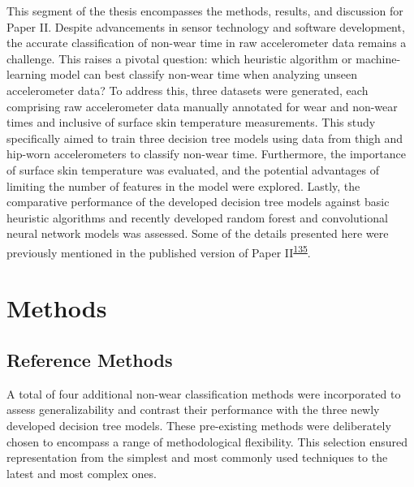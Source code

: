 \documentclass[
  10pt,
]{scrbook}
\begin{document}
This segment of the thesis encompasses the methods, results, and
discussion for Paper II. Despite advancements in sensor technology and
software development, the accurate classification of non-wear time in
raw accelerometer data remains a challenge. This raises a pivotal
question: which heuristic algorithm or machine-learning model can best
classify non-wear time when analyzing unseen accelerometer data? To
address this, three datasets were generated, each comprising raw
accelerometer data manually annotated for wear and non-wear times and
inclusive of surface skin temperature measurements. This study
specifically aimed to train three decision tree models using data from
thigh and hip-worn accelerometers to classify non-wear time.
Furthermore, the importance of surface skin temperature was evaluated,
and the potential advantages of limiting the number of features in the
model were explored. Lastly, the comparative performance of the
developed decision tree models against basic heuristic algorithms and
recently developed random forest and convolutional neural network models
was assessed. Some of the details presented here were previously
mentioned in the published version of Paper
II\textsuperscript{\protect\hyperlink{ref-skovgaard_generalizability_2023}{135}}.

\hypertarget{methods-1}{%
\section{Methods}\label{methods-1}}

\hypertarget{reference-methods}{%
\subsection{Reference Methods}\label{reference-methods}}

A total of four additional non-wear classification methods were
incorporated to assess generalizability and contrast their performance
with the three newly developed decision tree models. These pre-existing
methods were deliberately chosen to encompass a range of methodological
flexibility. This selection ensured representation from the simplest and
most commonly used techniques to the latest and most complex ones.
\end{document}
